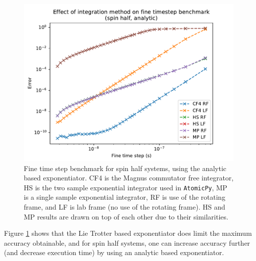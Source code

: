 \documentclass{jors}
\begin{document}
			\begin{figure}[h!]
				\includegraphics[scale=0.9]{benchmark_comparison_spin_half_a_publication.pdf}
				\caption{Fine time step benchmark for spin half systems, using the analytic based exponentiator. CF4 is the Magnus commutator free integrator, HS is the two sample exponential integrator used in \texttt{AtomicPy}, MP is a single sample exponential integrator, RF is use of the rotating frame, and LF is lab frame (no use of the rotating frame). HS and MP results are drawn on top of each other due to their similarities.}
				\label{fig:benchmark_comparison_spin_half_a}
			\end{figure}

			Figure \ref{fig:benchmark_comparison_spin_half_a} shows that the Lie Trotter based exponentiator does limit the maximum accuracy obtainable, and for spin half systems, one can increase accuracy further (and decrease execution time) by using an analytic based exponentiator.
\end{document}
